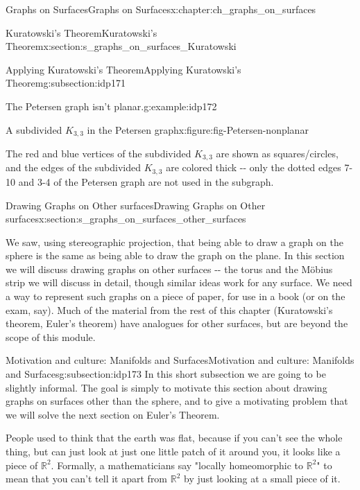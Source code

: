 \documentclass[oneside,10pt,]{book}
\numberwithin{equation}{section}
\newcommand{\reals}{\mathbb{R}}
\begin{document}
\begin{chapterptx}{Graphs on Surfaces}{}{Graphs on Surfaces}{}{}{x:chapter:ch_graphs_on_surfaces}
\begin{sectionptx}{Kuratowski's Theorem}{}{Kuratowski's Theorem}{}{}{x:section:s_graphs_on_surfaces_Kuratowski}
\begin{subsectionptx}{Applying Kuratowski's Theorem}{}{Applying Kuratowski's Theorem}{}{}{g:subsection:idp171}
\begin{example}{The Petersen graph isn't planar.}{g:example:idp172}
\begin{figureptx}{A subdivided \(K_{3,3}\) in the Petersen graph}{x:figure:fig-Petersen-nonplanar}{}
\begin{image}{0.05}{0.9}{0.05}
{\begin{tikzpicture}
\end{tikzpicture}
}%
\end{image}%
\tcblower
\end{figureptx}%
The red and blue vertices of the subdivided \(K_{3,3}\) are shown as squares\slash{}circles, and the edges of the subdivided \(K_{3,3}\) are colored thick -{}-{} only the dotted edges 7-10 and 3-4 of the Petersen graph are not used in the subgraph.%
\end{example}
\end{subsectionptx}
\end{sectionptx}
%
%
\typeout{************************************************}
\typeout{************************************************}
%
\begin{sectionptx}{Drawing Graphs on Other surfaces}{}{Drawing Graphs on Other surfaces}{}{}{x:section:s_graphs_on_surfaces_other_surfaces}
\begin{introduction}{}%
We saw, using stereographic projection, that being able to draw a graph on the sphere is the same as being able to draw the graph on the plane.  In this section we will discuss drawing graphs on other surfaces -{}-{} the torus and the Möbius strip we will discuss in detail, though similar ideas work for any surface.  We need a way to represent such graphs on a piece of paper, for use in a book (or on the exam, say).  Much of the material from the rest of this chapter (Kuratowski's theorem, Euler's theorem) have analogues for other surfaces, but are beyond the scope of this module.%
\end{introduction}%
%
%
\typeout{************************************************}
\typeout{************************************************}
%
\begin{subsectionptx}{Motivation and culture: Manifolds and Surfaces}{}{Motivation and culture: Manifolds and Surfaces}{}{}{g:subsection:idp173}
In this short subsection we are going to be slightly informal.  The goal is simply to motivate this section about drawing graphs on surfaces other than the sphere, and to give a motivating problem that we will solve the next section on Euler's Theorem.%
\par
People used to think that the earth was flat, because if you can't see the whole thing, but can just look at just one little patch of it around you, it looks like a piece of \(\reals^2\).  Formally, a mathematicians say "locally homeomorphic to \(\reals^2\)" to mean that you can't tell it apart from \(\reals^2\) by just looking at a small piece of it.%

\end{subsectionptx}
\end{sectionptx}
\end{chapterptx}
\end{document}
